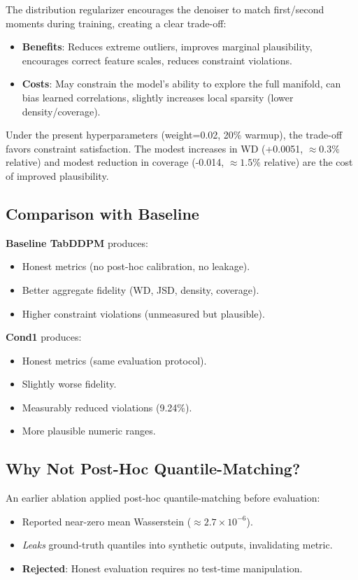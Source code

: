 \documentclass{article}
\begin{document}
The distribution regularizer encourages the denoiser to match first/second moments during training, creating a clear trade-off:

\begin{itemize}
  \item \textbf{Benefits}: Reduces extreme outliers, improves marginal plausibility, encourages correct feature scales, reduces constraint violations.
  
  \item \textbf{Costs}: May constrain the model's ability to explore the full manifold, can bias learned correlations, slightly increases local sparsity (lower density/coverage).
\end{itemize}

Under the present hyperparameters (weight=0.02, 20\% warmup), the trade-off favors constraint satisfaction. The modest increases in WD (+0.0051, $\approx 0.3\%$ relative) and modest reduction in coverage (-0.014, $\approx 1.5\%$ relative) are the cost of improved plausibility.

\subsection{Comparison with Baseline}

\textbf{Baseline TabDDPM} produces:
\begin{itemize}
  \item Honest metrics (no post-hoc calibration, no leakage).
  \item Better aggregate fidelity (WD, JSD, density, coverage).
  \item Higher constraint violations (unmeasured but plausible).
\end{itemize}

\textbf{Cond1} produces:
\begin{itemize}
  \item Honest metrics (same evaluation protocol).
  \item Slightly worse fidelity.
  \item Measurably reduced violations (9.24\%).
  \item More plausible numeric ranges.
\end{itemize}

\subsection{Why Not Post-Hoc Quantile-Matching?}

An earlier ablation applied post-hoc quantile-matching before evaluation:
\begin{itemize}
  \item Reported near-zero mean Wasserstein ($\approx 2.7 \times 10^{-6}$).
  \item \textit{Leaks} ground-truth quantiles into synthetic outputs, invalidating metric.
  \item \textbf{Rejected}: Honest evaluation requires no test-time manipulation.
\end{itemize}
\end{document}
